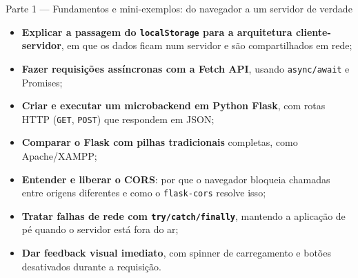   {Parte 1 — Fundamentos e mini-exemplos: do navegador a um servidor de verdade}
  {\hspace{4pt}
   \hspace{4pt}
   }

\vspace{0.4em}

\begin{boxObjetivos}
\begin{itemize}
  \item \textbf{Explicar a passagem do \texttt{localStorage} para a arquitetura cliente-servidor}, em que os dados ficam num servidor e são compartilhados em rede;
  \item \textbf{Fazer requisições assíncronas com a Fetch API}, usando \texttt{async/await} e Promises;
  \item \textbf{Criar e executar um microbackend em Python Flask}, com rotas HTTP (\texttt{GET}, \texttt{POST}) que respondem em JSON;
  \item \textbf{Comparar o Flask com pilhas tradicionais} completas, como Apache/XAMPP;
  \item \textbf{Entender e liberar o CORS}: por que o navegador bloqueia chamadas entre origens diferentes e como o \texttt{flask-cors} resolve isso;
  \item \textbf{Tratar falhas de rede com \texttt{try/catch/finally}}, mantendo a aplicação de pé quando o servidor está fora do ar;
  \item \textbf{Dar feedback visual imediato}, com spinner de carregamento e botões desativados durante a requisição.
\end{itemize}
\end{boxObjetivos}

\begin{mapaAula}
\end{mapaAula}

